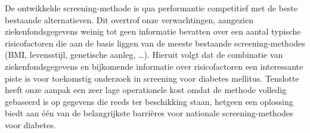 De ontwikkelde screening-methode is qua performantie competitief met de beste bestaande alternatieven. Dit overtrof onze verwachtingen, aangezien ziekenfondsgegevens weinig tot geen informatie bevatten over een aantal typische risicofactoren die aan de basis liggen van de meeste bestaande screening-methodes (BMI, levensstijl, genetische aanleg, \ldots). Hieruit volgt dat de combinatie van ziekenfondsgegevens en bijkomende informatie over risicofactoren een interessante piste is voor toekomstig onderzoek in screening voor diabetes mellitus. Tenslotte heeft onze aanpak een zeer lage operationele kost omdat de methode volledig gebaseerd is op gegevens die reeds ter beschikking staan, hetgeen een oplossing biedt aan \'e\'en van de belangrijkste barri\`eres voor nationale screening-methodes voor diabetes.



\cleardoublepage

